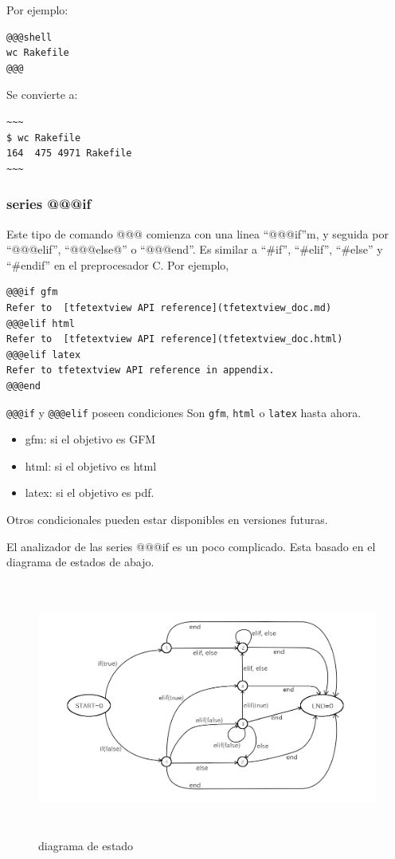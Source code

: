 Por ejemplo:

\begin{verbatim}
@@@shell
wc Rakefile
@@@
\end{verbatim}

Se convierte a:

\begin{verbatim}
~~~
$ wc Rakefile
164  475 4971 Rakefile
~~~
\end{verbatim}

\hypertarget{series-if}{%
\subsubsection{series @@@if}\label{series-if}}

Este tipo de comando @@@ comienza con una linea ``@@@if''m, y seguida
por ``@@@elif'', ``@@@else@'' o ``@@@end''. Es similar a ``\#if'',
``\#elif'', ``\#else'' y ``\#endif'' en el preprocesador C. Por ejemplo,

\begin{verbatim}
@@@if gfm
Refer to  [tfetextview API reference](tfetextview_doc.md)
@@@elif html
Refer to  [tfetextview API reference](tfetextview_doc.html)
@@@elif latex
Refer to tfetextview API reference in appendix.
@@@end
\end{verbatim}

\texttt{@@@if} y \texttt{@@@elif} poseen condiciones Son \texttt{gfm},
\texttt{html} o \texttt{latex} hasta ahora.

\begin{itemize}
\tightlist
\item
  gfm: si el objetivo es GFM
\item
  html: si el objetivo es html
\item
  latex: si el objetivo es pdf.
\end{itemize}

Otros condicionales pueden estar disponibles en versiones futuras.

El analizador de las series @@@if es un poco complicado. Esta basado en
el diagrama de estados de abajo.

\begin{figure}
\centering
\includegraphics[width=15cm,height=8.4cm]{../image/state_diagram.png}
\caption{diagrama de estado}
\end{figure}

